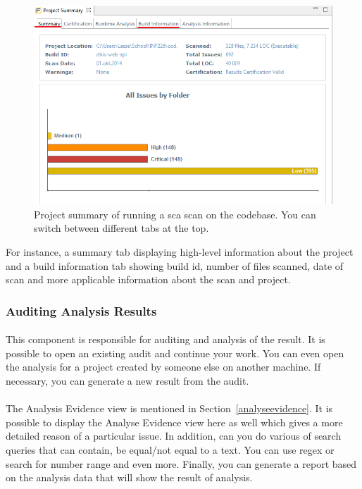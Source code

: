 \documentclass[11pt,english,a4paper]{report}
\begin{document}
\begin{figure}[h]
    \centering
    \includegraphics[scale=0.65]{images/fortifysummary-sc.png}
    \caption{Project summary of running a \gls{sca} scan on the codebase. You can switch between different tabs at the top. }
    \label{fig:fortifysummaryscreenshot}
\end{figure}

For instance, a summary tab displaying high-level information about the project and a build information tab showing build id, number of files scanned, date of scan and more applicable information about the scan and project. \cite{installation-usage-guide}

\subsubsection{Auditing Analysis Results}
\paragraph{}
This component is responsible for auditing and analysis of the result.
It is possible to open an existing audit and continue your work.
You can even open the analysis for a project created by someone else on another machine.
If necessary, you can generate a new result from the audit. \cite{installation-usage-guide}

\paragraph{}
The Analysis Evidence view is mentioned in Section~\ref{analyseevidence}. 
It is possible to display the Analyse Evidence view here as well which gives a more detailed reason of a particular issue.
In addition, can you do various of search queries that can contain, be equal/not equal to a text.
You can use \gls{regex} or search for number range and even more. 
Finally, you can generate a report based on the analysis data that will show the result of analysis. \cite{installation-usage-guide}
\end{document}
